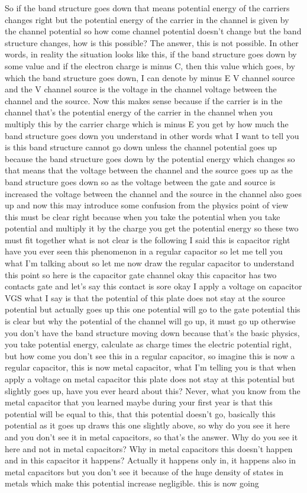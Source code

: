 So if the band structure goes down that means potential energy of the carriers changes right but the potential energy of the carrier in the channel is given by the channel potential so how come channel potential doesn't change but the band structure changes, how is this possible? The answer, this is not possible. In other words, in reality the situation looks like this, if the band structure goes down by some value and if the electron charge is minus C, then this value which goes, by which the band structure goes down, I can denote by minus E V channel source and the V channel source is the voltage in the channel voltage between the channel and the source. Now this makes sense because if the carrier is in the channel that's the potential energy of the carrier in the channel when you multiply this by the carrier charge which is minus E you get by how much the band structure goes down you understand in other words what I want to tell you is this band structure cannot go down unless the channel potential goes up because the band structure goes down by the potential energy which changes so that means that the voltage between the channel and the source goes up as the band structure goes down so as the voltage between the gate and source is increased the voltage between the channel and the source in the channel also goes up and now this may introduce some confusion from the physics point of view this must be clear right because when you take the potential when you take potential and multiply it by the charge you get the potential energy so these two must fit together what is not clear is the following I said this is capacitor right have you ever seen this phenomenon in a regular capacitor so let me tell you what I'm talking about so let me now draw the regular capacitor to understand this point so here is the capacitor gate channel okay this capacitor has two contacts gate and let's say this contact is sore okay I apply a voltage on capacitor VGS what I say is that the potential of this plate does not stay at the source potential but actually goes up this one potential will go to the gate potential this is clear but why the potential of the channel will go up, it must go up otherwise you don't have the band structure moving down because that's the basic physics, you take potential energy, calculate as charge times the electric potential right, but how come you don't see this in a regular capacitor, so imagine this is now a regular capacitor, this is now metal capacitor, what I'm telling you is that when apply a voltage on metal capacitor this plate does not stay at this potential but slightly goes up, have you ever heard about this? Never, what you know from the metal capacitor that you learned maybe during your first year is that this potential will be equal to this, that this potential doesn't go, basically this potential as it goes up draws this one slightly above, so why do you see it here and you don't see it in metal capacitors, so that's the answer. Why do you see it here and not in metal capacitors? Why in metal capacitors this doesn't happen and in this capacitor it happens? Actually it happens only in, it happens also in metal capacitors but you don't see it because of the huge density of states in metals which make this potential increase negligible. this is now going 
